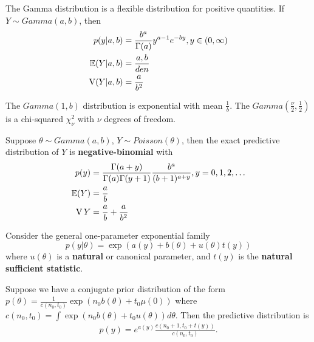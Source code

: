 \begin{defn}
  \label{sec:prob-bayes-theor-8}
  The Gamma distribution is a flexible distribution for positive
  quantities.  If $Y \sim Gamma(a, b)$, then
  \begin{align}
    \label{eq:6}
    p(y|a,b) &= \frac{b^{a}}{\Gamma(a)} y^{a-1} e^{-by}, y \in (0,
    \infty) \\
    \E{Y|a, b} &= \frac{a, b}{den} \\
    \V(Y|a, b) &= \frac{a}{b^{2}}
  \end{align}

  The $Gamma(1, b)$ distribution is exponential with mean
  $\frac{1}{b}$. The $Gamma(\frac{\nu}{2}, \frac{1}{2})$ is a
  chi-squared $\chi^{2}_{\nu}$ with $\nu$ degrees of freedom.
\end{defn}

\begin{thm}
  \label{sec:prob-bayes-theor-9}
  Suppose $\theta \sim Gamma(a, b)$, $Y \sim Poisson(\theta)$, then
  the exact predictive distribution of $Y$ is
  \textbf{negative-binomial} with
  \begin{align}
    \label{eq:8}
    p(y) &= \frac{\Gamma(a+y)}{\Gamma(a) \Gamma(y+1)}
    \frac{b^{a}}{(b+1)^{a+y}}, y= 0, 1, 2, \dots \\
    \E{Y} &= \frac{a}{b} \\
    \V{Y} &= \frac{a}{b} + \frac{a}{b^{2}}
  \end{align}
\end{thm}

\begin{thm}
  \label{sec:prob-bayes-theor-10}
  Consider the general one-parameter exponential family
  \begin{equation}
    \label{eq:9}
    p(y|\theta) = \exp(a(y) + b(\theta) + u(\theta)t(y))
  \end{equation} where $u(\theta)$ is a \textbf{natural} or canonical
  parameter, and $t(y)$ is the \textbf{natural sufficient statistic}.

  Suppose we have a conjugate prior distribution of the form
  $p(\theta) = \frac{1}{c(n_{0}, t_{0})} \exp(n_{0} b(\theta) + t_{0}
  \mu(0))$ where $c(n_{0}, t_{0}) = \int \exp(n_{0} b(\theta) + t_{0}
  u(\theta)) d\theta$.  Then the predictive distribution is
  \begin{align}
    \label{eq:10}
    p(y) = e^{a(y)} \frac{c(n_{0} + 1, t_{0} + t(y))}{c(n_{0}, t_{0})}.
  \end{align}
\end{thm}


